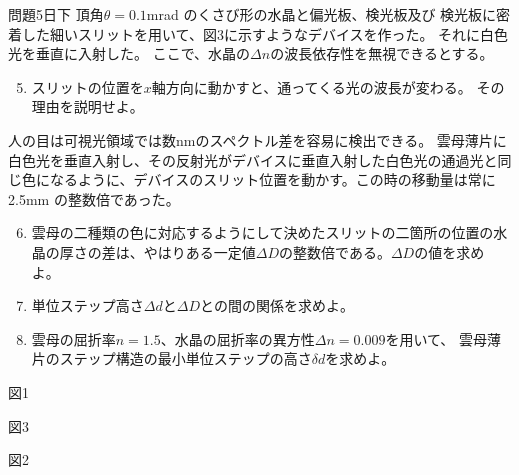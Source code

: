 \documentclass[fleqn]{jbook}
\begin{document}
\begin{question}{問題5}{日下}
頂角$\theta=0.1$mrad のくさび形の水晶と偏光板、検光板及び
検光板に密着した細いスリットを用いて、図3に示すようなデバイスを作った。
それに白色光を垂直に入射した。
ここで、水晶の$\Delta n$の波長依存性を無視できるとする。

\begin{enumerate}
\setcounter{enumi}{4}
\item スリットの位置を$x$軸方向に動かすと、通ってくる光の波長が変わる。
その理由を説明せよ。
\end{enumerate}

人の目は可視光領域では数nmのスペクトル差を容易に検出できる。
雲母薄片に白色光を垂直入射し、その反射光がデバイスに垂直入射した白色光の通過光と同じ色になるように、デバイスのスリット位置を動かす。この時の移動量は常に
2.5mm の整数倍であった。
\begin{enumerate}
\setcounter{enumi}{5}
\item 雲母の二種類の色に対応するようにして決めたスリットの二箇所の位置の水晶の厚さの差は、やはりある一定値$\Delta D$の整数倍である。$\Delta D$の値を求めよ。
\item 単位ステップ高さ$\Delta d$と$\Delta D$との間の関係を求めよ。
\item 雲母の屈折率$n=1.5$、水晶の屈折率の異方性$\Delta n=0.009$を用いて、
雲母薄片のステップ構造の最小単位ステップの高さ$\delta d$を求めよ。
\end{enumerate}

\noindent\parbox[t]{.6\textwidth}{図1}
\parbox[t]{.4\textwidth}{図3}

\noindent 図2\parbox{\textwidth}{\baselineskip}
\end{question}
\end{document}
